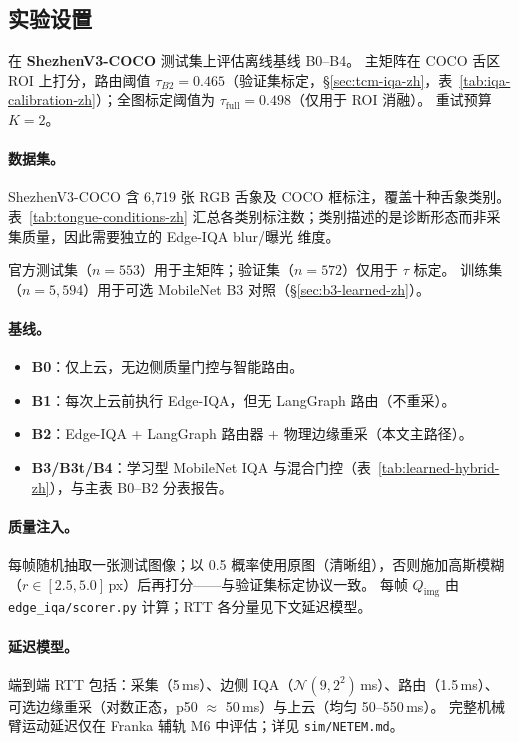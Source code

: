 \subsection{实验设置}
\label{sec:setup-zh}

在 \textbf{ShezhenV3-COCO} 测试集上评估离线基线 B0--B4。
主矩阵在 COCO 舌区 ROI 上打分，路由阈值 $\tau_{B2}{=}0.465$（验证集标定，\S\ref{sec:tcm-iqa-zh}，表~\ref{tab:iqa-calibration-zh}）；全图标定阈值为 $\tau_{\mathrm{full}}{=}0.498$（仅用于 ROI 消融）。
重试预算 $K{=}2$。

\paragraph{数据集。}
ShezhenV3-COCO 含 6{,}719 张 RGB 舌象及 COCO 框标注，覆盖十种舌象类别。
表~\ref{tab:tongue-conditions-zh} 汇总各类别标注数；类别描述的是诊断形态而非采集质量，因此需要独立的 Edge-IQA blur/曝光 维度。

官方测试集（$n{=}553$）用于主矩阵；验证集（$n{=}572$）仅用于 $\tau$ 标定。
训练集（$n{=}5{,}594$）用于可选 MobileNet B3 对照（\S\ref{sec:b3-learned-zh}）。

\paragraph{基线。}
\begin{itemize}
  \item \textbf{B0}：仅上云，无边侧质量门控与智能路由。
  \item \textbf{B1}：每次上云前执行 Edge-IQA，但无 LangGraph 路由（不重采）。
  \item \textbf{B2}：Edge-IQA + LangGraph 路由器 + 物理边缘重采（本文主路径）。
  \item \textbf{B3/B3t/B4}：学习型 MobileNet IQA 与混合门控（表~\ref{tab:learned-hybrid-zh}），与主表 B0--B2 分表报告。
\end{itemize}

\paragraph{质量注入。}
每帧随机抽取一张测试图像；以 0.5 概率使用原图（清晰组），否则施加高斯模糊（$r\in[2.5,5.0]$\,px）后再打分——与验证集标定协议一致。
每帧 $Q_{\mathrm{img}}$ 由 \texttt{edge\_iqa/scorer.py} 计算；RTT 各分量见下文延迟模型。

\paragraph{延迟模型。}
端到端 RTT 包括：采集（5\,ms）、边侧 IQA（$\mathcal{N}(9,2^2)$\,ms）、路由（1.5\,ms）、可选边缘重采（对数正态，p50 $\approx$ 50\,ms）与上云（均匀 50--550\,ms）。
完整机械臂运动延迟仅在 Franka 辅轨 M6 中评估；详见 \texttt{sim/NETEM.md}。

